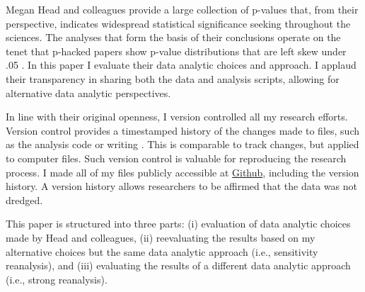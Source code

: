 Megan Head and colleagues provide a large collection of p-values that, from their perspective, indicates widespread statistical significance seeking throughout the sciences. The analyses that form the basis of their conclusions operate on the tenet that p-hacked papers show p-value distributions that are left skew under .05 \cite{Simonsohn2014}. In this paper I evaluate their data analytic choices and approach. I applaud their transparency in sharing both the data and analysis scripts, allowing for alternative data analytic perspectives.

In line with their original openness, I version controlled all my research efforts. Version control provides a timestamped history of the changes made to files, such as the analysis code or writing \cite{Ram2013}. This is comparable to track changes, but applied to computer files. Such version control is valuable for reproducing the research process. I made all of my files publicly accessible at \href{https://github.com/chartgerink/2015head}{Github}, including the version history. A version history allows researchers to be affirmed that the data was not dredged.

This paper is structured into three parts: (i) evaluation of data analytic choices made by Head and colleagues, (ii) reevaluating the results based on my alternative choices but the same data analytic approach (i.e., sensitivity reanalysis), and (iii) evaluating the results of a different data analytic approach (i.e., strong reanalysis). 